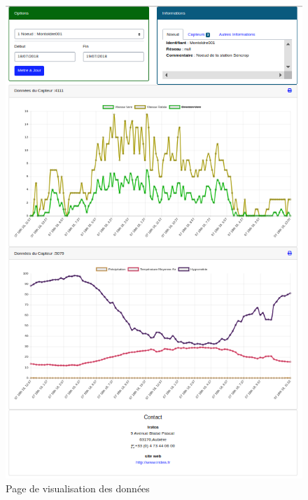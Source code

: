 \begin{figure}
    \centering
    \includegraphics[height=.9\textheight]{images/db_visualisation.png}
    \caption{Page de visualisation des données}
    \label{fig:Page de visualisation des données}
\end{figure}


